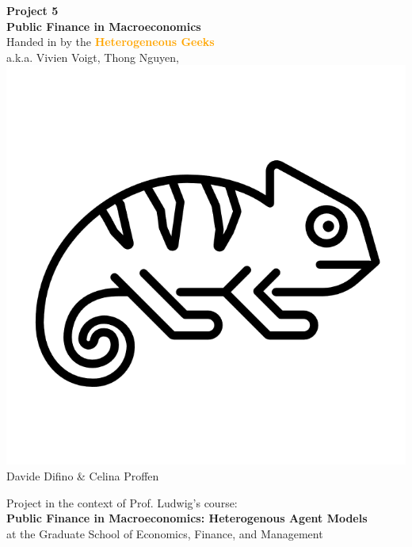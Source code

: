 \documentclass[12pt,a4paper]{article}
\begin{document}
\begin{center}
       \vspace*{4cm}
       \huge\textbf{Project 5} \\
       \vspace{0.4cm}
       \large \textbf{Public Finance in Macroeconomics} \\
       \vspace{0.5cm}
        \large Handed in by the \textcolor{orange}{\textbf{Heterogeneous Geeks}} \\
        \vspace{0.3cm}
        a.k.a. Vivien Voigt, Thong Nguyen, \includegraphics[scale=0.06]{geek.png}\\Davide Difino \& Celina Proffen \\
       \vspace{1.5cm}
       \vfill



        Project in the context of Prof. Ludwig's course: \\
        \textbf{Public Finance in Macroeconomics: Heterogenous Agent Models}\\
        at the Graduate School of Economics, Finance, and Management
       \vspace{0.8cm}
   \end{center}
\end{document}
